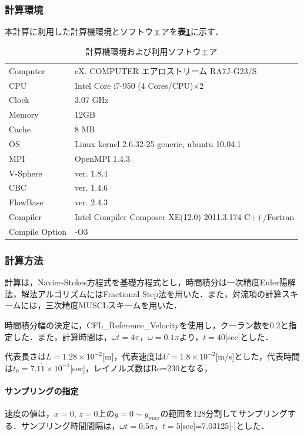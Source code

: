 \subsubsection{計算環境}
本計算に利用した計算機環境とソフトウェアを\textbf{表\ref{tbl: stokes env}}に示す．

\begin{table}[htdp]
\small
\caption{計算機環境および利用ソフトウェア}
\begin{center}
\begin{tabular}{ll}\toprule
Computer & eX. COMPUTER エアロストリーム RA7J-G23/S\\
CPU & Intel Core i7-950 (4 Cores/CPU)$\times$2\\
Clock & 3.07 GHz\\
Memory & 12GB \\
Cache & 8 MB\\
OS & Linux kernel 2.6.32-25-generic, ubuntu 10.04.1\\ \hline
MPI & OpenMPI 1.4.3\\
V-Sphere & ver. 1.8.4\\
CBC & ver. 1.4.6\\
FlowBase & ver. 2.4.3\\ \hline
Compiler & Intel Compiler Composer XE(12.0) 2011.3.174 C++/Fortran\\
Compile Option & -O3\\
\bottomrule
\end{tabular}
\end{center}
\label{tbl: stokes env}
\end{table}

\subsubsection{計算方法}
計算は，Navier-Stokes方程式を基礎方程式とし，時間積分は一次精度Euler陽解法，解法アルゴリズムにはFractional Step法を用いた．また，対流項の計算スキームには，三次精度MUSCLスキームを用いた．

時間積分幅の決定に，CFL\_Reference\_Velocityを使用し，クーラン数を0.2と指定した．また，計算時間は，$\omega t=4\pi$，$\omega=0.1\pi$より，$t=40$[sec]とした．

代表長さは$L=1.28\times 10^{-2}$[m]，代表速度は$U=1.8\times 10^{-2}$[m/s]とした，代表時間は$t_0=7.1\dot{1}\times 10^{-1}$[sec]，レイノルズ数はRe=230となる，

\paragraph{サンプリングの指定}
速度の値は，$x=0, \, z=0$上の$y=0 \sim y_{max}$の範囲を128分割してサンプリングする．サンプリング時間間隔は，$\omega t=0.5\pi$，$t=5$[sec]=7.03125[-]とした．

